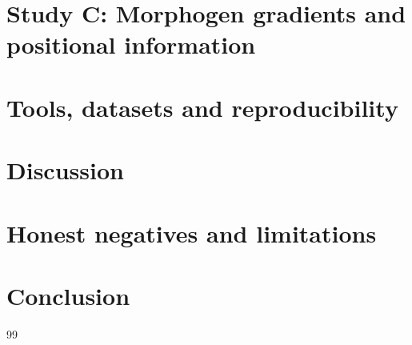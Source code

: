 \documentclass[12pt]{article}
\begin{document}




\section{Study C: Morphogen gradients and positional information}

\section{Tools, datasets and reproducibility}

\newpage

\section{Discussion}

\section{Honest negatives and limitations}







\section{Conclusion}

\begin{thebibliography}{99}

\end{thebibliography}
\appendix

\end{document}
